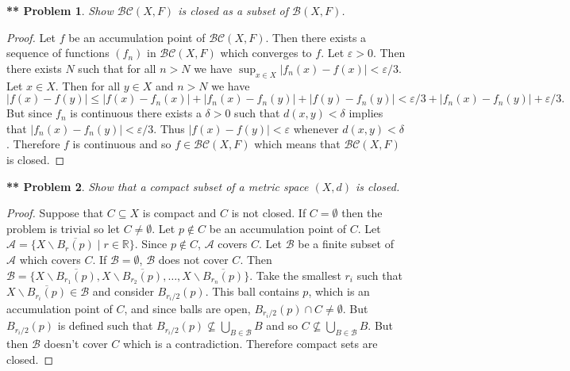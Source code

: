 \documentclass{article}
\newtheorem{**}{** Problem}
\begin{document}
\begin{flushleft}
\begin{**}
Show $\mathcal{BC} (X, F)$ is closed as a subset of $\mathcal{B} (X, F)$.
\end{**}
\begin{proof}
Let $f$ be an accumulation point of $\mathcal{BC} (X, F)$. Then there exists a sequence of functions $(f_n)$ in $\mathcal{BC} (X, F)$ which converges to $f$. Let $\varepsilon > 0$. Then there exists $N$ such that for all $n > N$ we have $\sup_{x \in X} |f_n(x) - f(x)| < \varepsilon/3$. Let $x \in X$. Then for all $y \in X$ and $n > N$ we have
\[
|f(x) - f(y)| \leq |f(x) - f_n(x)| + |f_n(x) - f_n(y)| + |f(y) - f_n(y)| < \varepsilon/3 + |f_n(x) - f_n(y)| + \varepsilon/3.
\]
But since $f_n$ is continuous there exists a $\delta > 0$ such that $d(x,y) < \delta$ implies that $|f_n(x) - f_n(y)| < \varepsilon/3$. Thus $|f(x) - f(y)| < \varepsilon$ whenever $d(x,y) < \delta$. Therefore $f$ is continuous and so $f \in \mathcal{BC} (X, F)$ which means that $\mathcal{BC} (X, F)$ is closed.
\end{proof}

\begin{**}
Show that a compact subset of a metric space $(X, d)$ is closed.
\end{**}
\begin{proof}
Suppose that $C \subseteq X$ is compact and $C$ is not closed. If $C = \emptyset$ then the problem is trivial so let $C \neq \emptyset$. Let $p \notin C$ be an accumulation point of $C$. Let $\mathcal{A} = \{X \backslash \overline{B_r(p)} \mid r \in \mathbb{R}\}$. Since $p \notin C$, $\mathcal{A}$ covers $C$. Let $\mathcal{B}$ be a finite subset of $\mathcal{A}$ which covers $C$. If $\mathcal{B} = \emptyset$, $\mathcal{B}$ does not cover $C$. Then $\mathcal{B} = \{X \backslash \overline{B_{r_1}(p)}, X \backslash \overline{B_{r_2}(p)}, \dots , X \backslash \overline{B_{r_n}(p)}\}$. Take the smallest $r_i$ such that $X \backslash \overline{B_{r_i}(p)} \in \mathcal{B}$ and consider $B_{r_i/2}(p)$. This ball contains $p$, which is an accumulation point of $C$, and since balls are open, $B_{r_i/2}(p) \cap C \neq \emptyset$. But $B_{r_i/2}(p)$ is defined such that $B_{r_i/2}(p) \nsubseteq \bigcup_{B \in \mathcal{B}} B$ and so $C \nsubseteq \bigcup_{B \in \mathcal{B}} B$. But then $\mathcal{B}$ doesn't cover $C$ which is a contradiction. Therefore compact sets are closed.
\end{proof}


\end{flushleft}
\end{document}
